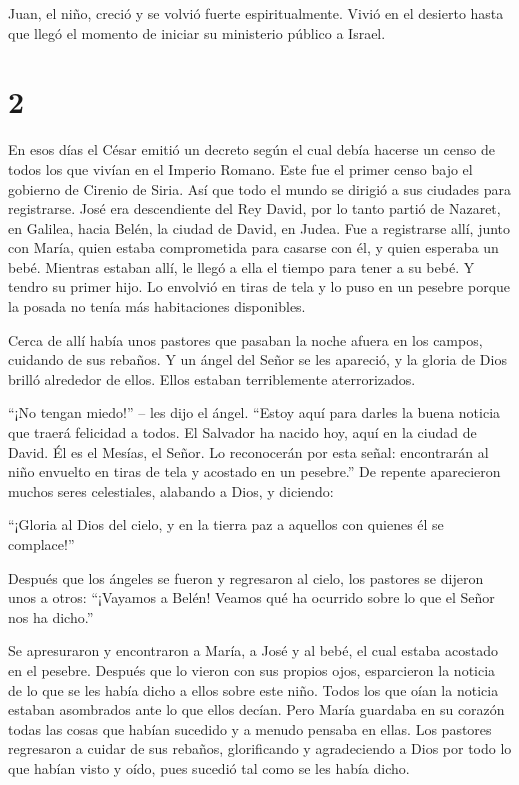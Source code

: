  Juan, el niño, creció y se volvió fuerte espiritualmente.
Vivió en el desierto hasta que llegó el momento de iniciar su ministerio
público a Israel.

\hypertarget{section-1}{%
\section{2}\label{section-1}}

 En esos días el César emitió un decreto según el cual debía
hacerse un censo de todos los que vivían en el Imperio Romano.
 Este fue el primer censo bajo el gobierno de Cirenio de
Siria.  Así que todo el mundo se dirigió a sus ciudades para
registrarse.  José era descendiente del Rey David, por lo
tanto partió de Nazaret, en Galilea, hacia Belén, la ciudad de David, en
Judea.  Fue a registrarse allí, junto con María, quien
estaba comprometida para casarse con él, y quien esperaba un bebé.
 Mientras estaban allí, le llegó a ella el tiempo para tener
a su bebé.  Y tendro su primer hijo. Lo envolvió en tiras de
tela y lo puso en un pesebre porque la posada no tenía más habitaciones
disponibles.

 Cerca de allí había unos pastores que pasaban la noche
afuera en los campos, cuidando de sus rebaños.  Y un ángel
del Señor se les apareció, y la gloria de Dios brilló alrededor de
ellos. Ellos estaban terriblemente aterrorizados.

 ``¡No tengan miedo!'' -- les dijo el ángel. ``Estoy aquí
para darles la buena noticia que traerá felicidad a todos. 
El Salvador ha nacido hoy, aquí en la ciudad de David. Él es el Mesías,
el Señor.  Lo reconocerán por esta señal: encontrarán al
niño envuelto en tiras de tela y acostado en un pesebre.'' 
De repente aparecieron muchos seres celestiales, alabando a Dios, y
diciendo:

 ``¡Gloria al Dios del cielo, y en la tierra paz a aquellos
con quienes él se complace!''

 Después que los ángeles se fueron y regresaron al cielo,
los pastores se dijeron unos a otros: ``¡Vayamos a Belén! Veamos qué ha
ocurrido sobre lo que el Señor nos ha dicho.''

 Se apresuraron y encontraron a María, a José y al bebé, el
cual estaba acostado en el pesebre.  Después que lo vieron
con sus propios ojos, esparcieron la noticia de lo que se les había
dicho a ellos sobre este niño.  Todos los que oían la
noticia estaban asombrados ante lo que ellos decían.  Pero
María guardaba en su corazón todas las cosas que habían sucedido y a
menudo pensaba en ellas.  Los pastores regresaron a cuidar
de sus rebaños, glorificando y agradeciendo a Dios por todo lo que
habían visto y oído, pues sucedió tal como se les había dicho.

